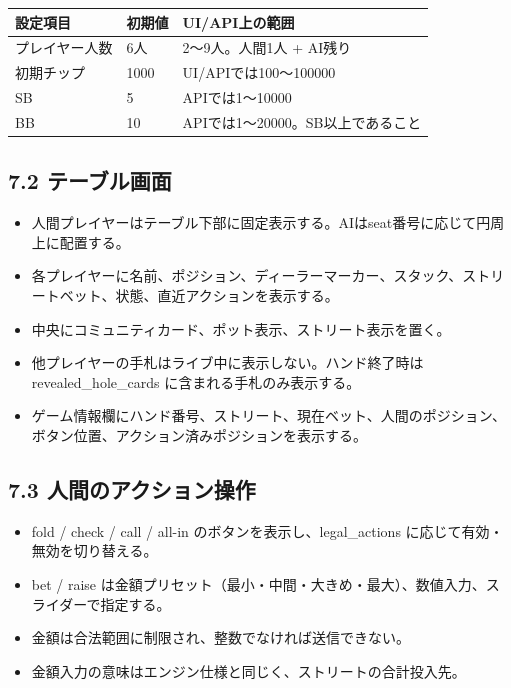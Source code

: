 \documentclass[
]{article}
\begin{document}
\begin{longtable}[]{@{}lll@{}}
\toprule\noalign{}
設定項目 & 初期値 & UI/API上の範囲 \\
\midrule\noalign{}
\endhead
\bottomrule\noalign{}
\endlastfoot
プレイヤー人数 & 6人 & 2～9人。人間1人 + AI残り \\
初期チップ & 1000 & UI/APIでは100～100000 \\
SB & 5 & APIでは1～10000 \\
BB & 10 & APIでは1～20000。SB以上であること \\
\end{longtable}

\subsection{7.2
テーブル画面}\label{ux30c6ux30fcux30d6ux30ebux753bux9762}

\begin{itemize}
\item
  人間プレイヤーはテーブル下部に固定表示する。AIはseat番号に応じて円周上に配置する。
\item
  各プレイヤーに名前、ポジション、ディーラーマーカー、スタック、ストリートベット、状態、直近アクションを表示する。
\item
  中央にコミュニティカード、ポット表示、ストリート表示を置く。
\item
  他プレイヤーの手札はライブ中に表示しない。ハンド終了時は
  revealed\_hole\_cards に含まれる手札のみ表示する。
\item
  ゲーム情報欄にハンド番号、ストリート、現在ベット、人間のポジション、ボタン位置、アクション済みポジションを表示する。
\end{itemize}

\subsection{7.3
人間のアクション操作}\label{ux4ebaux9593ux306eux30a2ux30afux30b7ux30e7ux30f3ux64cdux4f5c}

\begin{itemize}
\item
  fold / check / call / all-in のボタンを表示し、legal\_actions
  に応じて有効・無効を切り替える。
\item
  bet / raise
  は金額プリセット（最小・中間・大きめ・最大）、数値入力、スライダーで指定する。
\item
  金額は合法範囲に制限され、整数でなければ送信できない。
\item
  金額入力の意味はエンジン仕様と同じく、ストリートの合計投入先。
\end{itemize}
\end{document}
